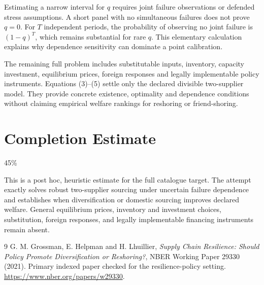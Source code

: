 \documentclass[11pt,a4paper]{article}
\begin{document}
Estimating a narrow interval for $q$ requires joint failure observations or defended stress assumptions. A short panel with no simultaneous failures does not prove $q=0$. For $T$ independent periods, the probability of observing no joint failure is $(1-q)^T$, which remains substantial for rare $q$. This elementary calculation explains why dependence sensitivity can dominate a point calibration.

The remaining full problem includes substitutable inputs, inventory, capacity investment, equilibrium prices, foreign responses and legally implementable policy instruments. Equations (3)--(5) settle only the declared divisible two-supplier model. They provide concrete existence, optimality and dependence conditions without claiming empirical welfare rankings for reshoring or friend-shoring.

\section{Completion Estimate}
45\%

This is a post hoc, heuristic estimate for the full catalogue target.
The attempt exactly solves robust two-supplier sourcing under uncertain failure dependence and establishes when diversification or domestic sourcing improves declared welfare. General equilibrium prices, inventory and investment choices, substitution, foreign responses, and legally implementable financing instruments remain absent.

\begin{thebibliography}{9}
 G. M. Grossman, E. Helpman and H. Lhuillier, \emph{Supply Chain Resilience: Should Policy Promote Diversification or Reshoring?}, NBER Working Paper 29330 (2021). Primary indexed paper checked for the resilience-policy setting. \url{https://www.nber.org/papers/w29330}.
\end{thebibliography}
\end{document}
